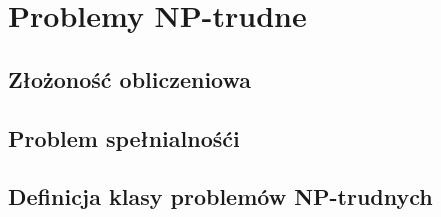 \chapter{Problemy NP-trudne}

\section{Złożoność obliczeniowa}

\section{Problem spełnialnośći}

\section{Definicja klasy problemów NP-trudnych}



